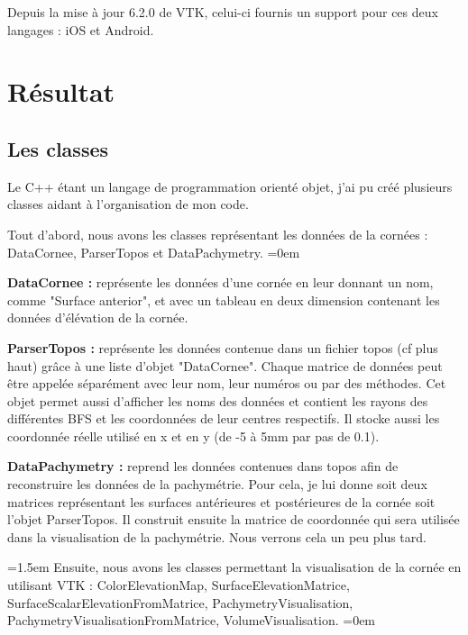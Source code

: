 \documentclass[a4paper,12pt]{article}
\begin{document}
	Depuis la mise à jour 6.2.0 de VTK, celui-ci fournis un support pour ces deux langages : iOS et Android. 



\newpage
\section{Résultat}
	\subsection{Les classes}
Le C++ étant un langage de programmation orienté objet, j'ai pu créé plusieurs classes aidant à l'organisation de mon code.   

\vspace{0.25cm}
Tout d'abord, nous avons les classes représentant les données de la cornées : DataCornee, ParserTopos et DataPachymetry.
\parindent=0em

\textbf{DataCornee : }
représente les données d'une cornée en leur donnant un nom, comme "Surface anterior", et avec un tableau en deux dimension contenant les données d'élévation de la cornée. 

\textbf{ParserTopos : }
représente les données contenue dans un fichier topos (cf plus haut) grâce à une liste d'objet "DataCornee". Chaque matrice de données peut être appelée séparément avec leur nom, leur numéros ou par des méthodes. Cet objet permet aussi d'afficher les noms des données et contient les rayons des différentes BFS et les coordonnées de leur centres respectifs. Il stocke aussi les coordonnée réelle utilisé en x et en y (de -5 à 5mm par pas de 0.1). 

\textbf{DataPachymetry : } 
reprend les données contenues dans topos afin de reconstruire les données de la pachymétrie. Pour cela, je lui donne soit deux matrices représentant les surfaces antérieures et postérieures de la cornée soit l'objet ParserTopos. Il construit ensuite la matrice de coordonnée qui sera utilisée dans la visualisation de la pachymétrie. Nous verrons cela un peu plus tard.

\vspace{0.25cm}
\parindent=1.5em
Ensuite, nous avons les classes permettant la visualisation de la cornée en utilisant VTK : ColorElevationMap, SurfaceElevationMatrice, SurfaceScalarElevationFromMatrice, PachymetryVisualisation, PachymetryVisualisationFromMatrice, VolumeVisualisation.
\parindent=0em
\end{document}
